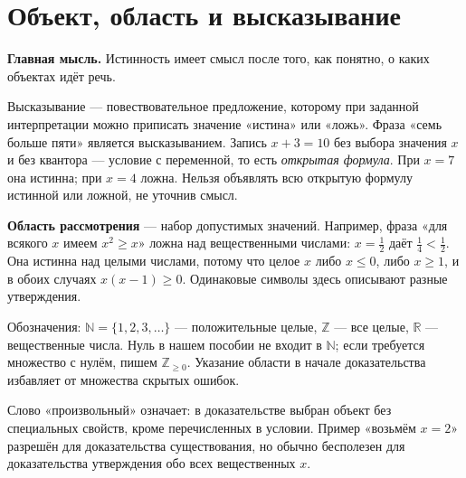 \documentclass[11pt,a4paper,openany]{book}
\begin{document}
\medskip

\section{Объект, область и высказывание}\label{theory:2}

\begin{keybox}\textbf{Главная мысль.} Истинность имеет смысл после того, как понятно, о каких объектах идёт речь.\end{keybox}

Высказывание — повествовательное предложение, которому при заданной интерпретации можно приписать значение «истина» или «ложь». Фраза «семь больше пяти» является высказыванием. Запись $x+3=10$ без выбора значения $x$ и без квантора — условие с переменной, то есть \emph{открытая формула}. При $x=7$ она истинна; при $x=4$ ложна. Нельзя объявлять всю открытую формулу истинной или ложной, не уточнив смысл.


\textbf{Область рассмотрения} — набор допустимых значений. Например, фраза «для всякого $x$ имеем $x^2\ge x$» ложна над вещественными числами: $x=\tfrac12$ даёт $\tfrac14<\tfrac12$. Она истинна над целыми числами, потому что целое $x$ либо $x\le0$, либо $x\ge1$, и в обоих случаях $x(x-1)\ge0$. Одинаковые символы здесь описывают разные утверждения.


Обозначения: $\mathbb N=\{1,2,3,\ldots\}$ — положительные целые, $\mathbb Z$ — все целые, $\mathbb R$ — вещественные числа. Нуль в нашем пособии не входит в $\mathbb N$; если требуется множество с нулём, пишем $\mathbb Z_{\ge0}$. Указание области в начале доказательства избавляет от множества скрытых ошибок.


Слово «произвольный» означает: в доказательстве выбран объект без специальных свойств, кроме перечисленных в условии. Пример «возьмём $x=2$» разрешён для доказательства существования, но обычно бесполезен для доказательства утверждения обо всех вещественных $x$.


\begin{center}
\end{center}
\end{document}
